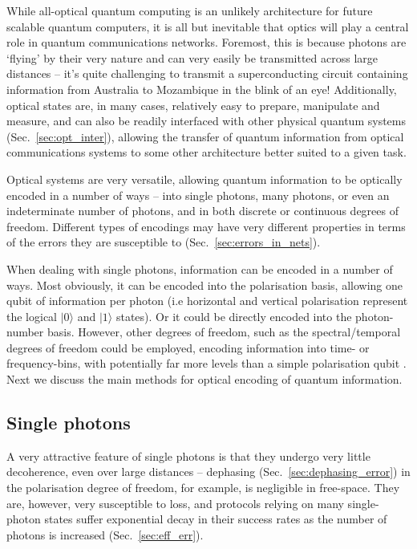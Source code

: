 \documentclass[aps,rmp,twocolumn,amsmath,amssymb,nofootinbib,superscriptaddress,longbibliography,floatfix,table-of-contents,eqsecnum]{revtex4-1}
\newcommand{\ket}[1]{|#1\rangle}
\begin{document}
While all-optical quantum computing is an unlikely architecture for future scalable quantum computers, it is all but inevitable that optics will play a central role in quantum communications networks. Foremost, this is because photons are `flying' by their very nature and can very easily be transmitted across large distances -- it's quite challenging to transmit a superconducting circuit containing information from Australia to Mozambique in the blink of an eye! Additionally, optical states are, in many cases, relatively easy to prepare, manipulate and measure, and can also be readily interfaced with other physical quantum systems (Sec.~\ref{sec:opt_inter}), allowing the transfer of quantum information from optical communications systems to some other architecture better suited to a given task.

Optical systems are very versatile, allowing quantum information to be optically encoded in a number of ways -- into single photons, many photons, or even an indeterminate number of photons, and in both discrete or continuous degrees of freedom. Different types of encodings may have very different properties in terms of the errors they are susceptible to (Sec.~\ref{sec:errors_in_nets}).

When dealing with single photons, information can be encoded in a number of ways. Most obviously, it can be encoded into the polarisation basis, allowing one qubit of information per photon (i.e horizontal and vertical polarisation represent the logical $\ket{0}$ and $\ket{1}$ states). Or it could be directly encoded into the photon-number basis. However, other degrees of freedom, such as the spectral/temporal degrees of freedom could be employed, encoding information into time- or frequency-bins, with potentially far more levels than a simple polarisation qubit \cite{bib:RohdeInfCap13}. Next we discuss the main methods for optical encoding of quantum information.

%
%

\subsection{Single photons} \label{sec:single_phot_enc} 

A very attractive feature of single photons is that they undergo very little decoherence, even over large distances -- dephasing (Sec.~\ref{sec:dephasing_error}) in the polarisation degree of freedom, for example, is negligible in free-space. They are, however, very susceptible to loss, and protocols relying on many single-photon states suffer exponential decay in their success rates as the number of photons is increased (Sec.~\ref{sec:eff_err}).
\end{document}
